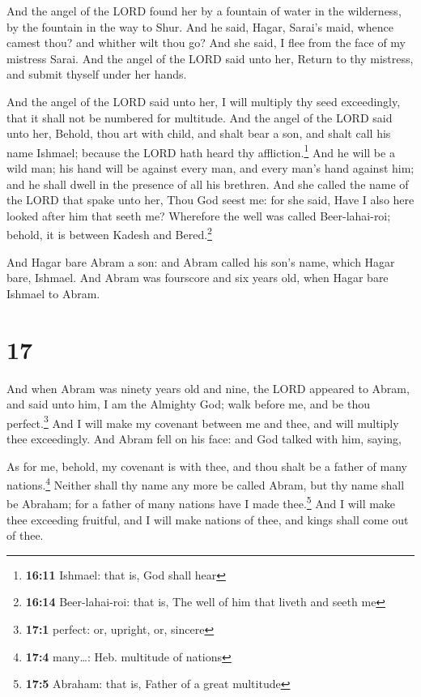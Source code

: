  And the angel of the LORD found her by a fountain of
water in the wilderness, by the fountain in the way to Shur.
 And he said, Hagar, Sarai's maid, whence camest thou? and
whither wilt thou go? And she said, I flee from the face of my mistress
Sarai.  And the angel of the LORD said unto her, Return to
thy mistress, and submit thyself under her hands.

 And the angel of the LORD said unto her, I will multiply
thy seed exceedingly, that it shall not be numbered for multitude.
 And the angel of the LORD said unto her, Behold, thou
art with child, and shalt bear a son, and shalt call his name Ishmael;
because the LORD hath heard thy affliction.\footnote{\textbf{16:11}
  Ishmael: that is, God shall hear}  And he will be a
wild man; his hand will be against every man, and every man's hand
against him; and he shall dwell in the presence of all his brethren.
 And she called the name of the LORD that spake unto her,
Thou God seest me: for she said, Have I also here looked after him that
seeth me?  Wherefore the well was called Beer-lahai-roi;
behold, it is between Kadesh and Bered.\footnote{\textbf{16:14}
  Beer-lahai-roi: that is, The well of him that liveth and seeth me}

 And Hagar bare Abram a son: and Abram called his son's
name, which Hagar bare, Ishmael.  And Abram was fourscore
and six years old, when Hagar bare Ishmael to Abram.

\hypertarget{section-16}{%
\section{17}\label{section-16}}

 And when Abram was ninety years old and nine, the LORD
appeared to Abram, and said unto him, I am the Almighty God; walk before
me, and be thou perfect.\footnote{\textbf{17:1} perfect: or, upright,
  or, sincere}  And I will make my covenant between me and
thee, and will multiply thee exceedingly.  And Abram fell
on his face: and God talked with him, saying,

 As for me, behold, my covenant is with thee, and thou
shalt be a father of many nations.\footnote{\textbf{17:4} many\ldots:
  Heb. multitude of nations}  Neither shall thy name any
more be called Abram, but thy name shall be Abraham; for a father of
many nations have I made thee.\footnote{\textbf{17:5} Abraham: that is,
  Father of a great multitude}  And I will make thee
exceeding fruitful, and I will make nations of thee, and kings shall
come out of thee.

